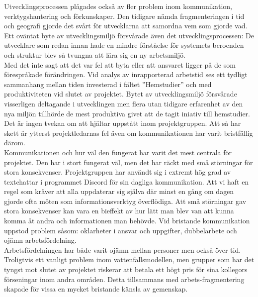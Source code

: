 \documentclass[paper=a4, fontsize=11pt,twoside]{article}
\begin{document}
Utvecklingsprocessen plågades också av fler problem inom kommunikation, 
verktygshantering och förkunskaper. Den tidigare nämda fragmenteringen i tid och 
geografi gjorde det svårt för utvecklarna att samordna vem som gjorde vad.\\

Ett oväntat byte av utvecklingsmiljö försvårade även det utvecklingsprocessen: 
De utvecklare som redan innan hade en mindre förståelse för systemets beroenden och 
struktur blev så tvungna att lära sig en ny arbetsmiljö.\\

Med det inte sagt att det var fel att byta eller att ansvaret ligger på de som 
förespråkade förändringen. Vid analys av inrapporterad arbetstid ses ett tydligt 
sammanhang mellan tiden investerad i fältet ”Hemstudier” och med produktiviteten 
vid slutet av projektet. Bytet av utvecklingsmiljö försvårade visserligen deltagande 
i utvecklingen men flera utan tidigare erfarenhet av den nya miljön tillhörde de mest 
produktiva givet att de tagit iniativ till hemstudier.\\

Det är ingen tvekan om att hjältar uppstått inom projektgruppen. 
Att så har skett är ytterst projektledarnas fel även om kommunikationen har 
varit bristfällig därom.\\

Kommunikationen och hur väl den fungerat har varit det mest centrala för projektet. 
Den har i stort fungerat väl, men det har räckt med små störningar för stora konsekvenser. 
Projektgruppen har användt sig i extremt hög grad av textchattar i programmet Discord för 
sin dagliga kommunikation. Att vi haft en regel som kräver att alla uppdaterar sig 
själva där minst en gång om dagen gjorde ofta möten som informationsverktyg överflödiga. 
Att små störningar gav stora konsekvenser kan vara en bieffekt av hur lätt man blev 
van att kunna komma åt andra och informationen man behövde. Vid bristande kommunikation 
uppstod problem såsom: oklarheter i ansvar och uppgifter, dubbelarbete och ojämn 
arbetsfördelning.\\

Arbetsfördelningen har både varit ojämn mellan personer men också över tid. 
Troligtvis ett vanligt problem inom vattenfallsmodellen, men grupper som har det 
tyngst mot slutet av projektet riskerar att betala ett högt pris för sina kollegors 
förseningar inom andra områden. Detta tillsammans med arbets-fragmentering skapade för 
vissa en mycket bristande känsla av gemenskap.\\
\end{document}
